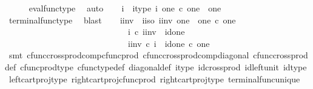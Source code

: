 \begin{isabellebody}
\ \ \ \ \isamarkupfalse%
\ eval{\isacharunderscore}{\kern0pt}func{\isacharunderscore}{\kern0pt}type\ \isamarkupfalse%
\ auto\isanewline
\ \ \isamarkupfalse%
\ i\ \ i{\isacharunderscore}{\kern0pt}type{\isacharcolon}{\kern0pt}\ {\isachardoublequoteopen}i{\isacharcolon}{\kern0pt}\ one\ {\isasymtimes}\isactrlsub c\ one\ {\isasymrightarrow}\ one{\isachardoublequoteclose}\isanewline
\ \ \ \ \isamarkupfalse%
\ terminal{\isacharunderscore}{\kern0pt}func{\isacharunderscore}{\kern0pt}type\ \isamarkupfalse%
\ blast\isanewline
\ \ \isamarkupfalse%
\ i{\isacharunderscore}{\kern0pt}inv\ \ i{\isacharunderscore}{\kern0pt}iso{\isacharcolon}{\kern0pt}\ {\isachardoublequoteopen}i{\isacharunderscore}{\kern0pt}inv{\isacharcolon}{\kern0pt}\ one{\isasymrightarrow}\ \ one\ {\isasymtimes}\isactrlsub c\ one\ {\isasymand}\ \isanewline
\ \ \ \ \ \ \ \ \ \ \ \ \ \ \ \ \ \ \ \ \ \ \ \ \ \ \ \ \ i\ {\isasymcirc}\isactrlsub c\ i{\isacharunderscore}{\kern0pt}inv\ {\isacharequal}{\kern0pt}\ id{\isacharparenleft}{\kern0pt}one{\isacharparenright}{\kern0pt}\ {\isasymand}\ \ \isanewline
\ \ \ \ \ \ \ \ \ \ \ \ \ \ \ \ \ \ \ \ \ \ \ \ \ \ \ \ \ i{\isacharunderscore}{\kern0pt}inv\ {\isasymcirc}\isactrlsub c\ i\ {\isacharequal}{\kern0pt}\ id{\isacharparenleft}{\kern0pt}one\ {\isasymtimes}\isactrlsub c\ one{\isacharparenright}{\kern0pt}{\isachardoublequoteclose}\isanewline
\ \ \ \ \isamarkupfalse%
\ {\isacharparenleft}{\kern0pt}smt\ cfunc{\isacharunderscore}{\kern0pt}cross{\isacharunderscore}{\kern0pt}prod{\isacharunderscore}{\kern0pt}comp{\isacharunderscore}{\kern0pt}cfunc{\isacharunderscore}{\kern0pt}prod\ cfunc{\isacharunderscore}{\kern0pt}cross{\isacharunderscore}{\kern0pt}prod{\isacharunderscore}{\kern0pt}comp{\isacharunderscore}{\kern0pt}diagonal\ cfunc{\isacharunderscore}{\kern0pt}cross{\isacharunderscore}{\kern0pt}prod{\isacharunderscore}{\kern0pt}def\ cfunc{\isacharunderscore}{\kern0pt}prod{\isacharunderscore}{\kern0pt}type\ cfunc{\isacharunderscore}{\kern0pt}type{\isacharunderscore}{\kern0pt}def\ diagonal{\isacharunderscore}{\kern0pt}def\ i{\isacharunderscore}{\kern0pt}type\ id{\isacharunderscore}{\kern0pt}cross{\isacharunderscore}{\kern0pt}prod\ id{\isacharunderscore}{\kern0pt}left{\isacharunderscore}{\kern0pt}unit\ id{\isacharunderscore}{\kern0pt}type\ left{\isacharunderscore}{\kern0pt}cart{\isacharunderscore}{\kern0pt}proj{\isacharunderscore}{\kern0pt}type\ right{\isacharunderscore}{\kern0pt}cart{\isacharunderscore}{\kern0pt}proj{\isacharunderscore}{\kern0pt}cfunc{\isacharunderscore}{\kern0pt}prod\ right{\isacharunderscore}{\kern0pt}cart{\isacharunderscore}{\kern0pt}proj{\isacharunderscore}{\kern0pt}type\ terminal{\isacharunderscore}{\kern0pt}func{\isacharunderscore}{\kern0pt}unique{\isacharparenright}{\kern0pt}\isanewline

\end{isabellebody}
